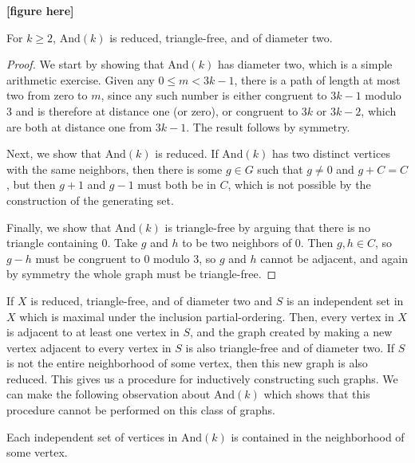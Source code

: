  \textbf{[figure here]}

\begin{lemma}
	For $k\geq 2$, $\mathrm{And}(k)$ is reduced, triangle-free, and of diameter two.
\end{lemma}

\begin{proof}
	We start by showing that $\mathrm{And}(k)$ has diameter two, which is a simple arithmetic exercise.  Given any $0\leq m < 3k-1$, there is a path of length at most two from zero to $m$, since any such number is either congruent to $3k-1$ modulo 3 and is therefore at distance one (or zero), or congruent to $3k$ or $3k-2$, which are both at distance one from $3k-1$.  The result follows by symmetry.
	
	Next, we show that $\mathrm{And}(k)$ is reduced.  If $\mathrm{And}(k)$ has two distinct vertices with the same neighbors, then there is some $g\in G$ such that $g\neq 0$ and $g+C=C$, but then $g+1$ and $g-1$ must both be in $C$, which is not possible by the construction of the generating set.
	
	Finally, we show that $\mathrm{And}(k)$ is triangle-free by arguing that there is no triangle containing 0.  Take $g$ and $h$ to be two neighbors of 0.  Then $g,h\in C$, so $g-h$ must be congruent to 0 modulo 3, so $g$ and $h$ cannot be adjacent, and again by symmetry the whole graph must be triangle-free.
	
\end{proof}


If $X$ is reduced, triangle-free, and of diameter two and $S$ is an independent set in $X$ which is maximal under the inclusion partial-ordering.  Then, every vertex in $X$ is adjacent to at least one vertex in $S$, and the graph created by making a new vertex adjacent to every vertex in $S$ is also triangle-free and of diameter two.  If $S$ is not the entire neighborhood of some vertex, then this new graph is also reduced.  This gives us a procedure for inductively constructing such graphs.  We can make the following observation about $\mathrm{And}(k)$ which shows that this procedure cannot be performed on this class of graphs.

\begin{lemma}
	{Each independent set of vertices in $\mathrm{And}(k)$ is contained in the neighborhood of some vertex.}
\end{lemma}


